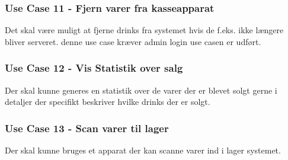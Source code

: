 \subsubsection*{Use Case 11 - Fjern varer fra kasseapparat}
Det skal være muligt at fjerne drinks fra systemet hvis de f.eks. ikke længere bliver serveret. denne use case kræver admin login use casen er udført.

\subsubsection*{Use Case 12 - Vis Statistik over salg}
Der skal kunne generes en statistik over de varer der er blevet solgt gerne i detaljer der specifikt beskriver hvilke drinks der er solgt.

\subsubsection*{Use Case 13 - Scan varer til lager}
Der skal kunne bruges et apparat der kan scanne varer ind i lager systemet. 